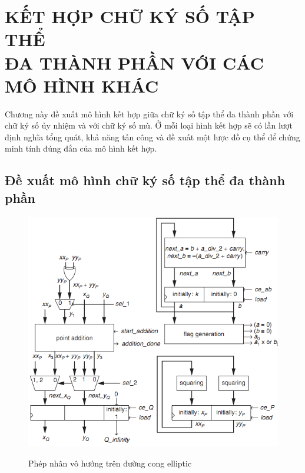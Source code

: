 \chapter[CHƯƠNG MẪU-KẾT HỢP CHỮ KÝ SỐ TẬP THỂ ĐA THÀNH PHẦN VỚI CÁC MÔ HÌNH KHÁC]{KẾT HỢP CHỮ KÝ SỐ TẬP THỂ\\ ĐA THÀNH PHẦN VỚI CÁC MÔ HÌNH KHÁC} \label{chuchukykethop}  %


Chương này đề xuất mô hình kết hợp giữa chữ ký số tập thể đa thành phần với chữ ký số ủy nhiệm và với chữ ký số mù. Ở mỗi loại hình kết hợp sẽ có lần lượt định nghĩa tổng quát, khả năng tấn công và đề xuất một lược đồ cụ thể để chứng minh tính đúng đắn của mô hình kết hợp.

\section{\bf Đề xuất mô hình chữ ký số tập thể đa thành phần}

\begin{figure}[ht]	
	\begin{center}		
		\includegraphics[scale=0.8]{nhanelliptic}
		\\		
	\end{center}	
	\caption{Phép nhân vô hướng trên đường cong elliptic}	
	\label{h.kytapthe33}
\end{figure}

